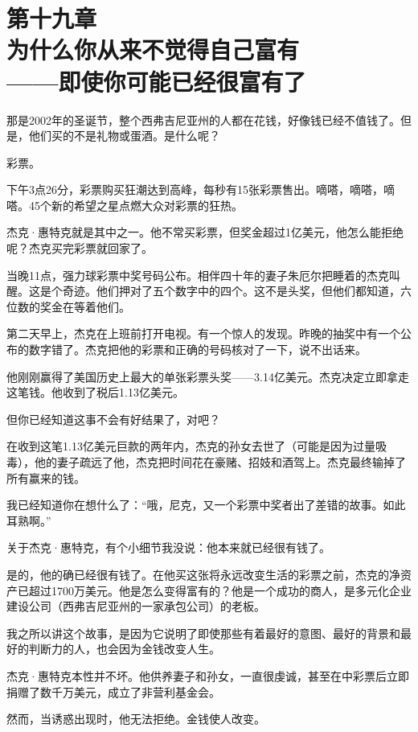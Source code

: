 \section[第十九章\q 为什么你从来不觉得自己富有——即使你可能已经很富有了]{第十九章\\ 为什么你从来不觉得自己富有\\ \hfill ——即使你可能已经很富有了}
\renewcommand{\bookchapter}{19}
\setcounter{figure}{0}
\setcounter{table}{0}

那是2002年的圣诞节，整个西弗吉尼亚州的人都在花钱，好像钱已经不值钱了。但是，他们买的不是礼物或蛋酒。是什么呢？

彩票。

下午3点26分，彩票购买狂潮达到高峰，每秒有15张彩票售出。嘀嗒，嘀嗒，嘀嗒。45个新的希望之星点燃大众对彩票的狂热。

杰克·惠特克就是其中之一。他不常买彩票，但奖金超过1亿美元，他怎么能拒绝呢？杰克买完彩票就回家了。

当晚11点，强力球彩票中奖号码公布。相伴四十年的妻子朱厄尔把睡着的杰克叫醒。这是个奇迹。他们押对了五个数字中的四个。这不是头奖，但他们都知道，六位数的奖金在等着他们。

第二天早上，杰克在上班前打开电视。有一个惊人的发现。昨晚的抽奖中有一个公布的数字错了。杰克把他的彩票和正确的号码核对了一下，说不出话来。

他刚刚赢得了美国历史上最大的单张彩票头奖——3.14亿美元。杰克决定立即拿走这笔钱。他收到了税后1.13亿美元。

但你已经知道这事不会有好结果了，对吧？

在收到这笔1.13亿美元巨款的两年内，杰克的孙女去世了（可能是因为过量吸毒），他的妻子疏远了他，杰克把时间花在豪赌、招妓和酒驾上。杰克最终输掉了所有赢来的钱。

我已经知道你在想什么了：“哦，尼克，又一个彩票中奖者出了差错的故事。如此耳熟啊。”

关于杰克·惠特克，有个小细节我没说：他本来就已经很有钱了。

是的，他的确已经很有钱了。在他买这张将永远改变生活的彩票之前，杰克的净资产已超过1700万美元。他是怎么变得富有的？他是一个成功的商人，是多元化企业建设公司（西弗吉尼亚州的一家承包公司）的老板。

我之所以讲这个故事，是因为它说明了即使那些有着最好的意图、最好的背景和最好的判断力的人，也会因为金钱改变人生。

杰克·惠特克本性并不坏。他供养妻子和孙女，一直很虔诚，甚至在中彩票后立即捐赠了数千万美元，成立了非营利基金会。

然而，当诱惑出现时，他无法拒绝。金钱使人改变。


